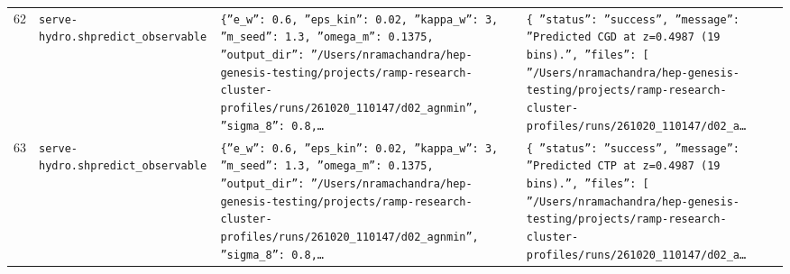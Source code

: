 \documentclass[11pt,a4paper]{article}
\begin{document}
\begin{longtable}{@{}p{}p{}p{}p{}@{}}
62 & \texttt{serve-hydro.sh}\newline\texttt{predict\_\allowbreak{}observable} & \texttt{\{''e\_\allowbreak{}w'':\allowbreak{} 0.6,\allowbreak{} ''eps\_\allowbreak{}kin'':\allowbreak{} 0.02,\allowbreak{} ''kappa\_\allowbreak{}w'':\allowbreak{} 3,\allowbreak{} ''m\_\allowbreak{}seed'':\allowbreak{} 1.3,\allowbreak{} ''omega\_\allowbreak{}m'':\allowbreak{} 0.1375,\allowbreak{} ''output\_\allowbreak{}dir'':\allowbreak{} ''/\allowbreak{}Users/\allowbreak{}nramachandra/\allowbreak{}hep-genesis-testing/\allowbreak{}projects/\allowbreak{}ramp-research-cluster-profiles/\allowbreak{}runs/\allowbreak{}261020\_\allowbreak{}110147/\allowbreak{}d02\_\allowbreak{}agnmin'',\allowbreak{} ''sigma\_\allowbreak{}8'':\allowbreak{} 0.8,\allowbreak{}\ldots{}\allowbreak{}} & \texttt{\{   ''status'':\allowbreak{} ''success'',\allowbreak{}   ''message'':\allowbreak{} ''Predicted CGD at z=\allowbreak{}0.4987 (19 bins)\allowbreak{}.'',\allowbreak{}   ''files'':\allowbreak{} [     ''/\allowbreak{}Users/\allowbreak{}nramachandra/\allowbreak{}hep-genesis-testing/\allowbreak{}projects/\allowbreak{}ramp-research-cluster-profiles/\allowbreak{}runs/\allowbreak{}261020\_\allowbreak{}110147/\allowbreak{}d02\_\allowbreak{}a\ldots{}\allowbreak{}} \\
63 & \texttt{serve-hydro.sh}\newline\texttt{predict\_\allowbreak{}observable} & \texttt{\{''e\_\allowbreak{}w'':\allowbreak{} 0.6,\allowbreak{} ''eps\_\allowbreak{}kin'':\allowbreak{} 0.02,\allowbreak{} ''kappa\_\allowbreak{}w'':\allowbreak{} 3,\allowbreak{} ''m\_\allowbreak{}seed'':\allowbreak{} 1.3,\allowbreak{} ''omega\_\allowbreak{}m'':\allowbreak{} 0.1375,\allowbreak{} ''output\_\allowbreak{}dir'':\allowbreak{} ''/\allowbreak{}Users/\allowbreak{}nramachandra/\allowbreak{}hep-genesis-testing/\allowbreak{}projects/\allowbreak{}ramp-research-cluster-profiles/\allowbreak{}runs/\allowbreak{}261020\_\allowbreak{}110147/\allowbreak{}d02\_\allowbreak{}agnmin'',\allowbreak{} ''sigma\_\allowbreak{}8'':\allowbreak{} 0.8,\allowbreak{}\ldots{}\allowbreak{}} & \texttt{\{   ''status'':\allowbreak{} ''success'',\allowbreak{}   ''message'':\allowbreak{} ''Predicted CTP at z=\allowbreak{}0.4987 (19 bins)\allowbreak{}.'',\allowbreak{}   ''files'':\allowbreak{} [     ''/\allowbreak{}Users/\allowbreak{}nramachandra/\allowbreak{}hep-genesis-testing/\allowbreak{}projects/\allowbreak{}ramp-research-cluster-profiles/\allowbreak{}runs/\allowbreak{}261020\_\allowbreak{}110147/\allowbreak{}d02\_\allowbreak{}a\ldots{}\allowbreak{}} \\

\end{longtable}
\end{document}
